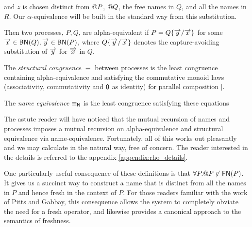 and $z$ is chosen distinct from $\mathsf{@} P$, $\mathsf{@} Q$, the free
names in $Q$, and all the names in $R$. Our $\alpha$-equivalence will
be built in the standard way from this substitution.

\begin{definition}
Then two processes, $P,Q$, are alpha-equivalent if $P = Q\{\overrightarrow{y}/\overrightarrow{x}\}$ for
some $\overrightarrow{x} \in \mathsf{BN}(Q),\overrightarrow{y} \in \mathsf{BN}(P)$, where $Q\{\overrightarrow{y}/\overrightarrow{x}\}$
denotes the capture-avoiding substitution of $\overrightarrow{y}$ for $\overrightarrow{x}$ in $Q$.
\end{definition}

\begin{definition}
  The {\em structural congruence} $\equiv$
  between processes \cite{SangiorgiWalker} is the least congruence containing
  alpha-equivalence and satisfying the commutative monoid laws
  (associativity, commutativity and $\mathsf{0}$ as identity) for parallel
  composition $|$.
\end{definition}

\begin{definition}
  The {\em name equivalence} $\mathsf{\equiv_N}$ is the least congruence
  satisfying these equations
\end{definition}

The astute reader will have noticed that the mutual recursion of names
and processes imposes a mutual recursion on alpha-equivalence and
structural equivalence via name-equivalence. Fortunately, all of this
works out pleasantly and we may calculate in the natural way, free of
concern. The reader interested in the details is referred to the
appendix \ref{appendix:rho_details}.

\begin{remark}\label{rem:no_self_referential_names}
  One particularly useful consequence of these definitions is that
  $\forall P. \mathsf{@} P \not\in \mathsf{FN}(P)$. It gives us a
  succinct way to construct a name that is distinct from all the names
  in $P$ and hence fresh in the context of $P$. For those readers
  familiar with the work of Pitts and Gabbay, this consequence allows
  the system to completely obviate the need for a fresh operator, and
  likewise provides a canonical approach to the semantics of
  freshness.
\end{remark}

